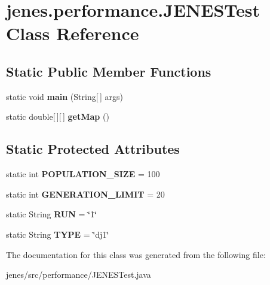 \hypertarget{classjenes_1_1performance_1_1_j_e_n_e_s_test}{\section{jenes.\-performance.\-J\-E\-N\-E\-S\-Test Class Reference}
\label{classjenes_1_1performance_1_1_j_e_n_e_s_test}
}
\subsection*{Static Public Member Functions}
\begin{DoxyCompactItemize}
\item 
\hypertarget{classjenes_1_1performance_1_1_j_e_n_e_s_test_afc2ae43a51b06536b61ff8c256d1a4b5}{static void {\bfseries main} (String\mbox{[}$\,$\mbox{]} args)}\label{classjenes_1_1performance_1_1_j_e_n_e_s_test_afc2ae43a51b06536b61ff8c256d1a4b5}

\item 
\hypertarget{classjenes_1_1performance_1_1_j_e_n_e_s_test_a7a02a502f510836006a2110099982511}{static double\mbox{[}$\,$\mbox{]}\mbox{[}$\,$\mbox{]} {\bfseries get\-Map} ()}\label{classjenes_1_1performance_1_1_j_e_n_e_s_test_a7a02a502f510836006a2110099982511}

\end{DoxyCompactItemize}
\subsection*{Static Protected Attributes}
\begin{DoxyCompactItemize}
\item 
\hypertarget{classjenes_1_1performance_1_1_j_e_n_e_s_test_abd366eca37794a675c7db2c210b71176}{static int {\bfseries P\-O\-P\-U\-L\-A\-T\-I\-O\-N\-\_\-\-S\-I\-Z\-E} = 100}\label{classjenes_1_1performance_1_1_j_e_n_e_s_test_abd366eca37794a675c7db2c210b71176}

\item 
\hypertarget{classjenes_1_1performance_1_1_j_e_n_e_s_test_ab2a38cace613491b31f31dcf06b8bf5a}{static int {\bfseries G\-E\-N\-E\-R\-A\-T\-I\-O\-N\-\_\-\-L\-I\-M\-I\-T} = 20}\label{classjenes_1_1performance_1_1_j_e_n_e_s_test_ab2a38cace613491b31f31dcf06b8bf5a}

\item 
\hypertarget{classjenes_1_1performance_1_1_j_e_n_e_s_test_a5c84bd75d825c995f6bebb79b45df6c1}{static String {\bfseries R\-U\-N} = \char`\"{}1\char`\"{}}\label{classjenes_1_1performance_1_1_j_e_n_e_s_test_a5c84bd75d825c995f6bebb79b45df6c1}

\item 
\hypertarget{classjenes_1_1performance_1_1_j_e_n_e_s_test_a6b35bbf22096ec3923e78d2bc407c2f4}{static String {\bfseries T\-Y\-P\-E} = \char`\"{}dj1\char`\"{}}\label{classjenes_1_1performance_1_1_j_e_n_e_s_test_a6b35bbf22096ec3923e78d2bc407c2f4}

\end{DoxyCompactItemize}


The documentation for this class was generated from the following file\-:\begin{DoxyCompactItemize}
\item 
jenes/src/performance/J\-E\-N\-E\-S\-Test.\-java\end{DoxyCompactItemize}
